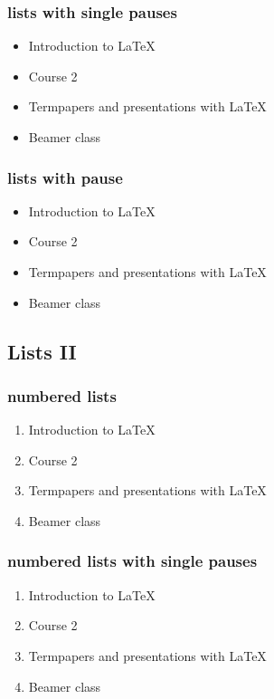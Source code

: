 \documentclass[hyperref={pdfpagelabels=false},aspectratio=169]{beamer}
\begin{document}
    \begin{frame}\frametitle{lists with single pauses}
        \begin{itemize}
            \item Introduction to  \LaTeX{}  \pause 
            \item Course 2 \pause 
            \item Termpapers and presentations with \LaTeX{}  \pause 
            \item Beamer class
        \end{itemize} 
    \end{frame}

    \begin{frame}\frametitle{lists with pause}
        \begin{itemize}[<+->]
            \item Introduction to  \LaTeX{}  
            \item Course 2
            \item Termpapers and presentations with \LaTeX{}  
            \item Beamer class
        \end{itemize} 
    \end{frame}


    \subsection{Lists II}
    \begin{frame}\frametitle{numbered lists}
        \begin{enumerate}
            \item Introduction to  \LaTeX{}   
            \item Course 2 
            \item Termpapers and presentations with \LaTeX{}  
            \item Beamer class
        \end{enumerate}
    \end{frame}

    \begin{frame}
        \frametitle{numbered lists with single pauses}
        \begin{enumerate}
            \item Introduction to  \LaTeX{}  \pause 
            \item Course 2 \pause 
            \item Termpapers and presentations with \LaTeX{}  \pause 
            \item Beamer class
        \end{enumerate}
    \end{frame}
\end{document}
